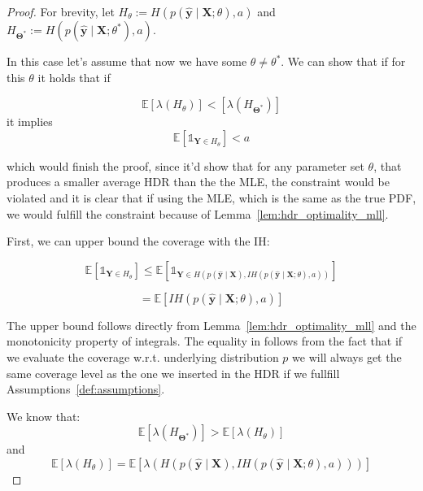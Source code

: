 \begin{proof}
    For brevity, let $H_{\theta} := H(p(\mathbf{\hat{y}}\mid \mathbf{X}; \theta), a)$ and $H_{\mathbf{\Theta^*}} := H(p(\mathbf{\hat{y}}\mid \mathbf{X}; \theta^*), a)$.

    In this case let's assume that now we have some $\theta \neq \theta^*$. We can show that if for this $\theta$ it holds that if

    \begin{equation}
        \mathbb{E} \left[ \lambda(H_{\theta})\right] 
        <
        \left[\lambda(H_{\mathbf{\Theta^*}}) \right]
    \end{equation}
    it implies
    \begin{equation}
        \mathbb{E} \left[ \mathds{1}_{\mathbf{Y} \in
        H_{\theta}} \right] < a
    \end{equation}

    which would finish the proof, since it'd show that for any parameter set $\theta$, that produces a smaller average HDR than the the MLE, the constraint would be violated and it is clear that if using the MLE, which is the same as the true PDF, we would fulfill the constraint because of Lemma~\ref{lem:hdr_optimality_mll}.

    First, we can upper bound the coverage with the IH:

    \begin{equation}
        \mathbb{E} \left[ \mathds{1}_{\mathbf{Y} \in
        H_{\theta}} \right]
        \leq 
        \mathbb{E} \left[ \mathds{1}_{\mathbf{Y} \in
        H(p(\mathbf{\hat{y}} \mid \mathbf{X}), IH(p(\mathbf{\hat{y}}\mid
        \mathbf{X};
        \theta), a))} \right]
        \label{eq:upper_bound}
    \end{equation}

    \begin{equation}
        = \mathbb{E}\left[IH(p(\mathbf{\hat{y}}\mid \mathbf{X}; \theta),
            a)
        \right]
        \label{eq:upper_bound_2}
    \end{equation}

    The upper bound follows directly from Lemma~\ref{lem:hdr_optimality_mll} and the monotonicity property of integrals. The equality in  follows from the fact that if we evaluate the coverage w.r.t. underlying distribution $p$ we will always get the same coverage level as the one we inserted in the HDR if we fullfill Assumptions~\ref{def:assumptions}.

    We know that:
    \begin{equation}
        \mathbb{E}\left[\lambda(H_{\mathbf{\Theta^*}})\right] > \mathbb{E}\left[ \lambda(H_{\theta}) \right]
        \label{eq:inequality_0}
    \end{equation}
    and
    \begin{equation}
        \mathbb{E}\left[ \lambda(H_{\theta}) \right]
        =\mathbb{E}\left[ \lambda(H(p(\mathbf{\hat{y}}\mid\mathbf{X}),
            IH(p(\mathbf{\hat{y}}\mid \mathbf{X}; \theta), a)))
            \right]
        \label{eq:inequality_1}
    \end{equation}


\end{proof}
